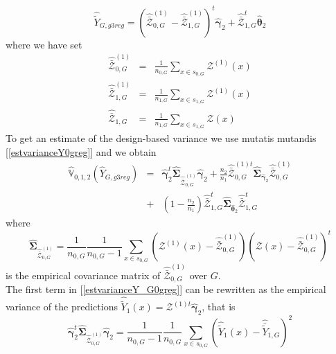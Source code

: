 \documentclass[a4paper,12pt,leqno, titlepage]{article}
\newcommand{\VAR}{\mathbb{V}}
\begin{document}
\begin{equation}\label{smallarea0greg}
\hat{\tilde{Y}}_{G,g3reg}
= (\hat{\bar{\pmb{\mathcal{Z}}}}_{0,G}^{(1)}-\hat{\bar{\pmb{\mathcal{Z}}}}_{1,G}^{(1)})^t\hat{\pmb{\gamma}}_2 +
\hat{\bar{\pmb{\mathcal{Z}}}}_{1,G}^t\hat{\pmb{\theta}}_{2}
\end{equation}
where we have set
\begin{eqnarray*}
 \hat{\bar{\pmb{\mathcal{Z}}}}_{0,G}^{(1)}&=&\frac{1}{n_{0,G}}\sum_{x\in{s_{0,G}}} \pmb{\mathcal{Z}}^{(1)}(x) \\ \hat{\bar{\pmb{\mathcal{Z}}}}_{1,G}^{(1)}&=&
 \frac{1}{n_{1,G}}\sum_{x\in{s_{1,G}}}\pmb{\mathcal{Z}}^{(1)}(x)\\
 \hat{\bar{\pmb{\mathcal{Z}}}}_{1,G}&=&
 \frac{1}{n_{1,G}}\sum_{x\in{s_{1,G}}}\pmb{\mathcal{Z}}(x)
 \end{eqnarray*}
 To get an estimate of the design-based variance we use mutatis mutandis [\ref{estvarianceY0greg}]
and we obtain
\begin{eqnarray}\label{estvarianceY_G0greg}
\hat{\VAR}_{0,1,2}(\hat{Y}_{G,g3reg})&=&\hat{\pmb{\gamma}}_2^t\hat{\pmb{\Sigma}}_{\hat{\bar{\pmb{\mathcal{Z}}}}^{(1)}_{0,G}}
\hat{\pmb{\gamma}}_2 +\frac{n_2}{n_1}\hat{\bar{\pmb{\mathcal{Z}}}}^{(1)t}_{0,G}
\hat{\pmb{\Sigma}}_{\hat{\pmb{\gamma}}_{2}}\hat{\bar{\pmb{\mathcal{Z}}}}^{(1)}_{0,G} \nonumber \\ &+& (1-\frac{n_2}{n_1})\hat{\bar{\pmb{\mathcal{Z}}}}^{t}_{1,G}\hat{\pmb{\Sigma}}_{\hat{\pmb{\theta}}_2}
\hat{\bar{\pmb{\mathcal{Z}}}}^{t}_{1,G}
\end{eqnarray}
where
\begin{equation}\label{estcovarextz-overG}
\hat{\pmb{\Sigma}}_{\hat{\bar{\pmb{\mathcal{Z}}}}^{(1)}_{0,G}}=
\frac{1}{n_{0,G}}\frac{1}{n_{0,G}-1}  \sum_{x\in{s_{0,G}}}(\pmb{\mathcal{Z}}^{(1)}(x)-
\hat{\bar{\pmb{\mathcal{Z}}}}^{(1)}_{0,G})(\pmb{\mathcal{Z}}(x)-\hat{\bar{\pmb{\mathcal{Z}}}}^{(1)}_{0,G})^t
\end{equation}
\noindent is the empirical covariance matrix of $\hat{\bar{\pmb{\mathcal{Z}}}}^{(1)}_{0,G}$ over $G$.\\
The first term in [\ref{estvarianceY_G0greg}] can be rewritten as the empirical variance of the predictions
$\hat{\tilde{Y}}_1(x)=\pmb{\mathcal{Z}}^{(1)t}\hat{\pmb{\gamma}}_2$, that is
\begin{equation*}
\hat{\pmb{\gamma}}_2^t\hat{\pmb{\Sigma}}_{\hat{\bar{\pmb{\mathcal{Z}}}}^{(1)}_{0,G}}\hat{\pmb{\gamma}}_2=
\frac{1}{n_{0,G}-1}\frac{1}{n_{0,G}}\sum_{x\in{s_{0,G}}}(\hat{\tilde{Y}}_1(x)-\hat{\bar{\tilde{Y}}}_{1,G})^2
\end{equation*}
\end{document}
